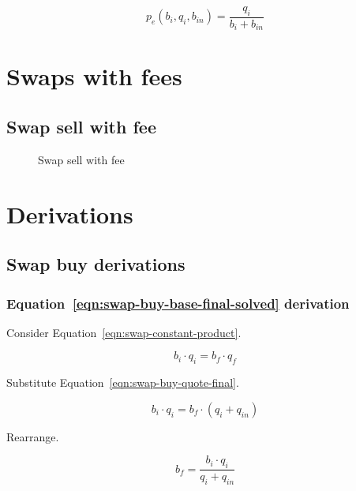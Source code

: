 \documentclass[table, twocolumn]{article}
\begin{document}
\begin{equation}\label{eqn:swap-sell-execution-price-solved}
	p_e (b_i, q_i, b_{in}) = \frac{q_i}{b_i + b_{in}}
\end{equation}

\section{Swaps with fees}\label{sec:swaps-with-fees}

\subsection{Swap sell with fee}\label{ssec:swap-sell-with-fee}

\begin{figure}[!htb]
	\centering
	
	\caption{Swap sell with fee}\label{fig:swap-sell-with-fee}
\end{figure}

\section{Derivations}\label{sec:derivations}

\subsection{Swap buy derivations}\label{ssec:swap-buy-derivations}

\subsubsection{Equation~\ref{eqn:swap-buy-base-final-solved} derivation}%
\label{sssec:equation-eqn-swap-buy-base-final-solved-derivation}

Consider Equation~\ref{eqn:swap-constant-product}.

\begin{equation}
	b_i \cdot q_i = b_f \cdot q_f \nonumber
\end{equation}

Substitute Equation~\ref{eqn:swap-buy-quote-final}.

\begin{equation}
	b_i \cdot q_i = b_f \cdot (q_i + q_{in}) \nonumber
\end{equation}

Rearrange.

\begin{equation}
	b_f = \frac{b_i \cdot q_i}{q_i + q_{in}} \nonumber
\end{equation}
\end{document}
